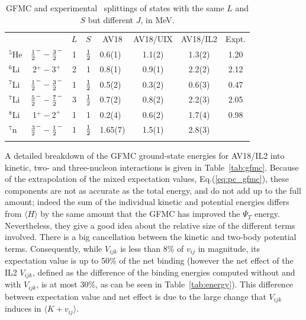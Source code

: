 \begin{table}
\caption{GFMC and experimental~\protect\cite{AS88,TUNL567} splittings of 
states with the same $L$ and $S$ but different $J$, in MeV.}
\label{tab:sosplit}
\begin{tabular}{lccccccc}
\toprule
       &                                  &$L$&  $S$        &  AV18  & AV18/UIX & AV18/IL2 & Expt.\\
\colrule
$^5$He &  $\textstyle{1\over2}^- - \textstyle{3\over2}^-$ & 1 & $\textstyle{1\over2}$ & 0.6(1)~ & 1.1(2) & 1.3(2) & 1.20 \\
$^6$Li &  2$^+ - 3^+$                     & 2 &     1         & 0.8(1)~ & 0.9(1) & 2.2(2) & 2.12 \\
$^7$Li &  $\textstyle{1\over2}^- - \textstyle{3\over2}^-$ & 1 & $\textstyle{1\over2}$ & 0.5(2)~ & 0.3(2) & 0.6(3) & 0.47 \\
$^7$Li &  $\textstyle{5\over2}^- - \textstyle{7\over2}^-$ & 3 & $\textstyle{1\over2}$ & 0.7(2)~ & 0.8(2) & 2.2(3) & 2.05 \\
$^8$Li &  1$^+ - 2^+$                     & 1 &     1         & 0.2(4)~ & 0.6(2) & 1.7(4) & 0.98 \\
\colrule
$^7$n  &  $\textstyle{3\over2}^- - \textstyle{1\over2}^-$ & 1 & $\textstyle{1\over2}$ & 1.65(7) & 1.5(1) & 2.8(3) &      \\
\botrule
\end{tabular}
\end{table}

A detailed breakdown of the GFMC ground-state energies for AV18/IL2
into kinetic, two- and
three-nucleon interactions is given in Table~\ref{tab:gfmc}.
Because of the extrapolation of the mixed expectation values,
Eq.(\ref{eq:pc_gfmc}), these components are not as accurate
as the total energy, and do not add up to the full amount;
indeed the sum of the individual kinetic and potential energies differs
from $\langle H \rangle$ by the same amount that the GFMC has improved
the $\Psi_T$ energy.
Nevertheless, they give a good idea about the relative size of the different
terms involved.
There is a big cancellation between the kinetic and two-body potential terms.
Consequently, while $V_{ijk}$ is less than 8\% of $v_{ij}$ in magnitude,
its expectation value is up to 50\% of the net binding (however
the net effect of the IL2 $V_{ijk}$, defined as the difference of the
binding energies computed without and with  $V_{ijk}$, is at most 30\%,
as can be seen in Table~\ref{tab:energy}).
This difference between expectation value and net effect is due to the large 
change that $V_{ijk}$ induces in $\langle K+v_{ij} \rangle$.

